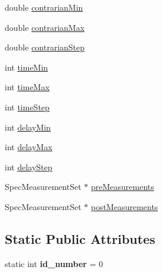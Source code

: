 \begin{DoxyCompactItemize}
\item 
double \hyperlink{class_chain_experiment_a343f957d771934c6bada7613c020c07f}{contrarian\-Min}
\item 
double \hyperlink{class_chain_experiment_a02ea31bc14bc89d32fba19ed3439ad3f}{contrarian\-Max}
\item 
double \hyperlink{class_chain_experiment_a072bef3805353ee08e7ac3b8e4d8d69b}{contrarian\-Step}
\item 
int \hyperlink{class_chain_experiment_a92b1a39b84c5d3f2642db40b951e4582}{time\-Min}
\item 
int \hyperlink{class_chain_experiment_a9d7233a2ba46450f3ff10494100f21b9}{time\-Max}
\item 
int \hyperlink{class_chain_experiment_a5be9b1c06782e8e8e365080bca05e61d}{time\-Step}
\item 
int \hyperlink{class_chain_experiment_a06dd6bc7fbeeb3d6a0f506e7e239240c}{delay\-Min}
\item 
int \hyperlink{class_chain_experiment_aece190c28fdde383004c31a75be5166a}{delay\-Max}
\item 
int \hyperlink{class_chain_experiment_ada234ba1f0da4c9f2828ac759d1c7c4f}{delay\-Step}
\item 
Spec\-Measurement\-Set $\ast$ \hyperlink{class_chain_experiment_adbc54d1d7cd2d86f838b0128e5597216}{pre\-Measurements}
\item 
Spec\-Measurement\-Set $\ast$ \hyperlink{class_chain_experiment_a9362d54e02df4c8dd2a461b7aa4e322a}{post\-Measurements}
\end{DoxyCompactItemize}
\subsection*{Static Public Attributes}
\begin{DoxyCompactItemize}
\item 
\hypertarget{class_chain_experiment_a1691a5dc572e94812033e06156995362}{static int {\bfseries id\-\_\-number} = 0}\label{class_chain_experiment_a1691a5dc572e94812033e06156995362}

\end{DoxyCompactItemize}


